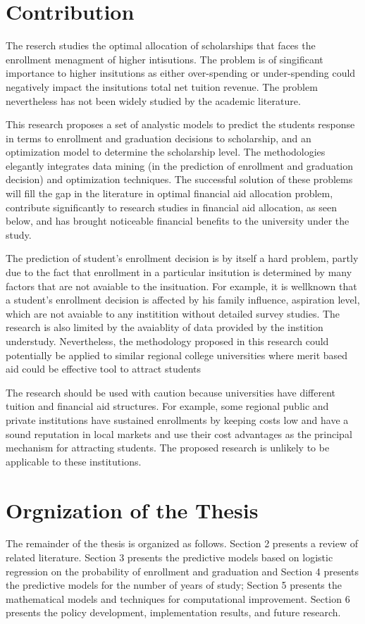 \documentclass[12pt,english]{report}
\begin{document}
\section{Contribution}

The reserch studies the optimal allocation of scholarships that faces the
enrollment menagment of higher intisutions.  The problem is of singificant
importance to higher insitutions as either over-spending or under-spending
could negatively impact the insitutions total net tuition revenue.  The problem
nevertheless has not been widely studied by the academic literature.

This research proposes  a set of analystic models to predict the students
response in terms to enrollment and graduation decisions to scholarship, and an
optimization model to determine the scholarship level.  The methodologies
elegantly integrates data mining (in the prediction of enrollment and
graduation decision) and optimization techniques. The successful solution of
these problems will fill the gap in the literature in optimal financial aid
allocation problem, contribute significantly to research studies in financial
aid allocation, as seen below, and has brought noticeable financial benefits to
the university under the study.

The prediction of student's enrollment decision is by itself a hard problem,
partly due to the fact that enrollment in a particular insitution is determined
by many factors that are not avaiable to the insituation.  For example, it is
wellknown that a student's enrollment decision is affected by his family
influence, aspiration level, which are not avaiable to any institition without
detailed survey studies.  The research is also limited by the avaiablity of
data provided by the instition understudy.   Nevertheless, the methodology
proposed in this research could potentially be applied to similar regional
college universities where merit based aid could be effective tool to attract
students

The research should be used with caution because universities have different
tuition and financial aid structures.  For example, some regional public and
private institutions have sustained enrollments by keeping costs low and have a
sound reputation in local markets and use their cost advantages as the
principal mechanism for attracting students.  The proposed research is unlikely
to be applicable to these institutions.

\section{Orgnization of the Thesis}
\vspace{0.25in}
The remainder of the thesis is organized as follows. Section 2 presents a
review of related literature. Section 3 presents the predictive models based on
logistic regression on the probability of enrollment and graduation and Section
4 presents the predictive models for the number of years of study; Section 5
presents the mathematical models and techniques for computational improvement.
Section 6 presents the policy development, implementation results, and future
research.
\end{document}
